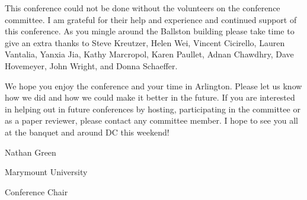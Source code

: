 \documentclass{article}
\begin{document}
This conference could not be done without the volunteers on the conference
committee. I am grateful for their help and experience and continued support
of this conference. As you mingle around the Ballston building please take time
to give an extra thanks to Steve Kreutzer, Helen Wei, Vincent Cicirello,
Lauren Vantalia, Yanxia Jia, Kathy Marcropol, Karen Paullet, Adnan Chawdhry,
Dave Hovemeyer, John Wright, and Donna Schaeffer.

We hope you enjoy the conference and your time in Arlington. Please let us know
how we did and how we could make it better in the future. If you are interested
in helping out in future conferences by hosting, participating in the committee
or as a paper reviewer, please contact any committee member. I hope to see you
all at the banquet and around DC this weekend!

\vspace{10pt}

\hfill Nathan Green

\hfill Marymount University

\hfill Conference Chair
\end{document}

